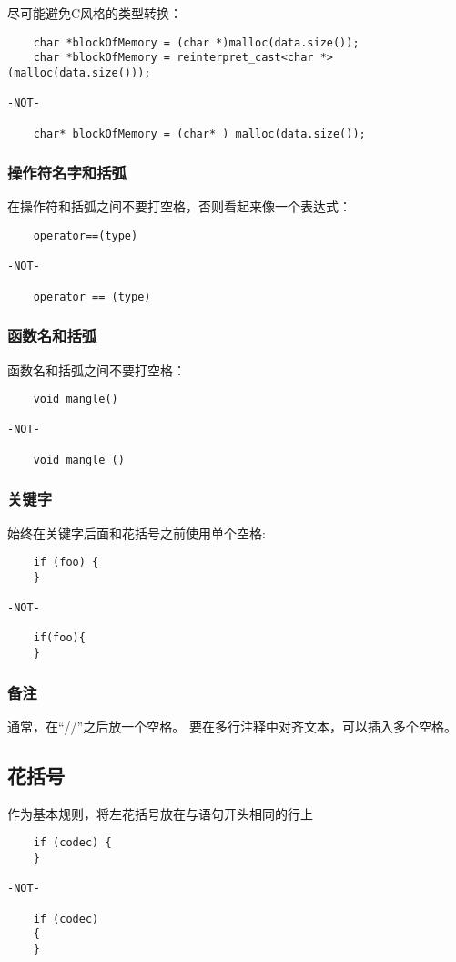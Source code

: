 尽可能避免C风格的类型转换：
\begin{lstlisting}
    char *blockOfMemory = (char *)malloc(data.size());
	char *blockOfMemory = reinterpret_cast<char *>(malloc(data.size()));

-NOT-

	char* blockOfMemory = (char* ) malloc(data.size());
\end{lstlisting}

\subsubsection{操作符名字和括弧}
在操作符和括弧之间不要打空格，否则看起来像一个表达式：
\begin{lstlisting}
	operator==(type)

-NOT-

	operator == (type)
\end{lstlisting}

\subsubsection{函数名和括弧}
函数名和括弧之间不要打空格：
\begin{lstlisting}
    void mangle()

-NOT-

	void mangle ()
\end{lstlisting}

\subsubsection{关键字}
始终在关键字后面和花括号之前使用单个空格:
\begin{lstlisting}
    if (foo) {
	}

-NOT-

	if(foo){
	}
\end{lstlisting}

\subsubsection{备注}
通常，在“//”之后放一个空格。 要在多行注释中对齐文本，可以插入多个空格。

\subsection{花括号}
作为基本规则，将左花括号放在与语句开头相同的行上
\begin{lstlisting}
    if (codec) {
	}

-NOT-

	if (codec)
	{
	}
\end{lstlisting}

